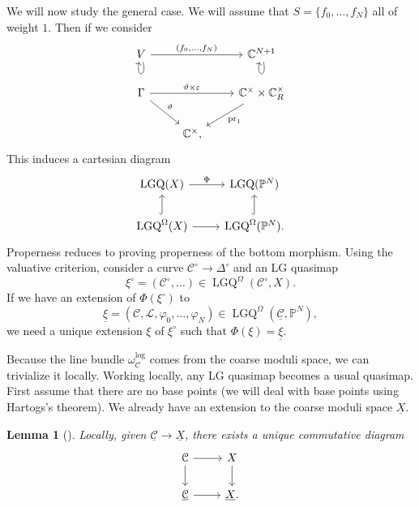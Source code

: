 \documentclass[10pt,oldfontcommands,oneside]{memoir}
\newtheorem{lem}[thm]{Lemma}
\theoremstyle{definition}
\theoremstyle{remark}
\theoremstyle{plain}
\theoremstyle{definition}
\theoremstyle{remark}
\newcommand{\C}{\mathbb{C}}
\renewcommand{\P}{\mathbb{P}}
\newcommand{\ep}{\varepsilon}
\newcommand{\mc}[1]{\mathcal{#1}}
\newcommand{\mr}[1]{\mathrm{#1}}
\newcommand{\on}[1]{\operatorname{#1}}
\newcommand{\ul}[1]{\underline{#1}}
\newcommand{\1}{\mathbf{1}}
\newcommand{\2}{\mathbf{2}}
\newcommand{\3}{\mathbf{3}}
\begin{document}
We will now study the general case. We will assume that $S = \{f_0, \ldots, f_N \}$ all of weight $1$. Then if we consider
\begin{equation*}
\begin{tikzcd}
    V \ar{rr}{(f_0, \ldots, f_N)} \ar[loop below] & & \C^{N+1} \ar[loop below] \\
    \Gamma \ar{rr}{\vartheta \times \ep} \ar{dr}{\vartheta} & & \C^{\times} \times \C^{\times}_R \ar{dl}{\mr{pr}_1} \\
    & \C^{\times},
\end{tikzcd}
\end{equation*}
This induces a cartesian diagram
\begin{equation*}
\begin{tikzcd}
    \on{LGQ}(X) \ar{r}{\Phi} & \on{LGQ}(\P^N) \\
    \on{LGQ}^{\Omega}(X) \ar{r} \ar[hookrightarrow]{u} & \on{LGQ}^{\Omega}(\P^N)\ar[hookrightarrow]{u}.
\end{tikzcd}
\end{equation*}
Properness reduces to proving properness of the bottom morphism. Using the valuative criterion, consider a curve $\mc{C}^{\circ} \to \Delta^{\circ}$ and an LG quasimap
\[\xi^{\circ} = (\mc{C}^{\circ},\ldots) \in \on{LGQ}^{\Omega}(\mc{C}^{\circ}, X). \]
If we have an extension of $\Phi(\xi^{\circ})$ to
\[ \ul{ \xi } = (\mc{C}, \mc{L}, \varphi_0, \ldots, \varphi_N) \in \on{LGQ}^{\Omega}(\ul{ \mc{C} }, \P^N), \]
we need a unique extension $\xi$ of $\xi^{\circ}$ such that $\Phi(\xi) = \ul{\xi}$.

Because the line bundle $\omega_{\mc{C}}^{\log}$ comes from the coarse moduli space, we can trivialize it locally. Working locally, any LG quasimap becomes a usual quasimap. First assume that there are no base points (we will deal with base points using Hartogs's theorem). We already have an extension to the coarse moduli space $\ul{X}$.

\begin{lem}[\cite{av}]
    Locally, given $\ul{\mc{C}} \to \ul{X}$, there exists a unique commutative diagram
    \begin{equation*}
    \begin{tikzcd}
        \mc{C} \ar{r} \ar{d} & X \ar{d} \\
        \ul{\mc{C}} \ar{r} & \ul{X}.
    \end{tikzcd}
    \end{equation*}
\end{lem}
\end{document}
